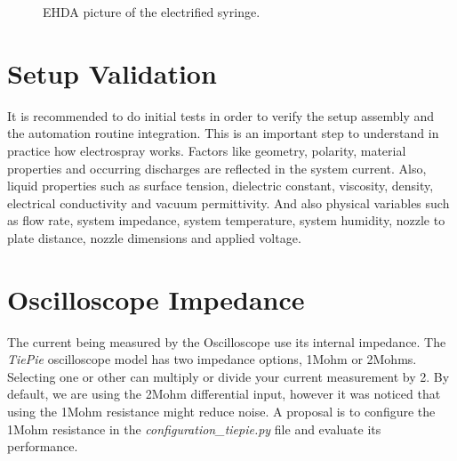 \begin{figure}[H]
    \centering
    \label{fig:nozzleElectr}
    \caption{EHDA picture of the electrified syringe.}
\end{figure}


\section{Setup Validation}
\label{sec:setup_validation}


It is recommended to do initial tests in order to verify the setup assembly and the automation routine integration. 
This is an important step to understand in practice how electrospray works.
Factors like geometry, polarity, material properties and occurring discharges are reflected in the system current.
Also, liquid properties such as surface tension, dielectric constant, viscosity, density, electrical conductivity and vacuum permittivity. 
And also physical variables such as flow rate, system impedance, system temperature, system humidity, nozzle to plate distance, nozzle dimensions and applied voltage.


\section{Oscilloscope Impedance}
\label{sec:osc_impedance}

The current being measured by the Oscilloscope use its internal impedance. 
The \emph{TiePie} oscilloscope model has two impedance options, 1Mohm or 2Mohms. 
Selecting one or other can multiply or divide your current measurement by 2. 
By default, we are using the 2Mohm differential input, however it was noticed that using the 1Mohm resistance might reduce noise. 
A proposal is to configure the 1Mohm resistance in the \emph{configuration\_tiepie.py} file and evaluate its performance.